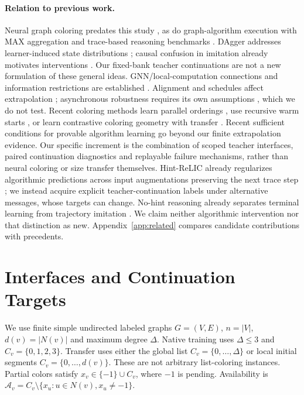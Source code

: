 \documentclass[10pt]{article}
\newcommand{\A}{\mathcal A}
\begin{document}
\paragraph{Relation to previous work.}
Neural graph coloring predates this study \citep{lemos2019coloring}, as do
graph-algorithm execution with MAX aggregation \citep{velickovic2020execution}
and trace-based reasoning benchmarks \citep{velickovic2022clrs,velickovic2021nar}.
DAgger addresses learner-induced state distributions \citep{ross2011dagger};
causal confusion in imitation already motivates interventions
\citep{dehaan2019causal}. Our fixed-bank teacher continuations are not a new
formulation of these general ideas. GNN/local-computation connections and
information restrictions are established
\citep{loukas2020depth,sato2019approximation}. Alignment and schedules affect
extrapolation \citep{xu2021extrapolate,mathys2023flood}; asynchronous robustness
requires its own assumptions \citep{solodova2025hogwild}, which we do not test.
Recent coloring methods learn parallel orderings \citep{langedal2025ordering},
use recursive warm starts \citep{vanderbush2026warm}, or learn contrastive
coloring geometry with transfer \citep{le2026contrastive}. Recent sufficient
conditions for provable algorithm learning \citep{wittig2026which} go beyond
our finite extrapolation evidence. Our specific increment is the combination
of scoped teacher interfaces, paired continuation diagnostics and replayable
failure mechanisms, rather than neural coloring or size transfer themselves.
Hint-ReLIC already regularizes algorithmic predictions across input
augmentations preserving the next trace step \citep{bevilacqua2023causal};
we instead acquire explicit teacher-continuation labels under alternative
messages, whose targets can change. No-hint reasoning already separates
terminal learning from trajectory imitation \citep{rodionov2023without}.
We claim neither algorithmic intervention nor that distinction as new.
Appendix~\ref{app:related} compares candidate contributions with precedents.

\section{Interfaces and Continuation Targets}
We use finite simple undirected labeled graphs $G=(V,E)$, $n=|V|$,
$d(v)=|N(v)|$ and maximum degree $\Delta$. Native training uses $\Delta\le3$
and $C_v=\{0,1,2,3\}$. Transfer uses either the global list
$C_v=\{0,\ldots,\Delta\}$ or local initial segments
$C_v=\{0,\ldots,d(v)\}$. These are not arbitrary list-coloring instances.
Partial colors satisfy $x_v\in\{-1\}\cup C_v$, where $-1$ is pending.
Availability is $\A_v=C_v\setminus\{x_u:u\in N(v),x_u\ne-1\}$.
\end{document}
